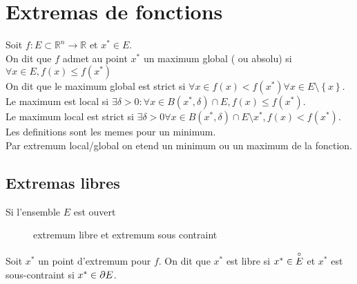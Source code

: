 \documentclass[../main.tex]{subfiles}
\begin{document}
\section{Extremas de fonctions}

\begin{defn}
	Soit $f: E \subset \mathbb{R}^n \to \mathbb{R}$ et $x^{*} \in E$.\\
	On dit que $f$ admet au point $x^{*}$ un maximum global ( ou absolu) si $\forall x \in E, f( x) \leq f( x^{*}) $ \\
	On dit que le maximum global est strict si $\forall x \in f( x) < f( x^{*}) \forall x \in E \setminus \left\{ x \right\} $.\\
	Le maximum est local si $\exists \delta >0 : \forall x \in B( x^{*},\delta) \cap E, f( x) \leq f( x^{*}) $.\\
	Le maximum local est strict si $\exists \delta >0 \forall x \in B( x^{*},\delta) \cap E \setminus x^{*}, f( x) < f( x^{*}) $.\\
	Les definitions sont les memes pour un minimum.\\
	Par extremum local/global on etend un minimum ou un maximum de la fonction.
\end{defn}
\subsection{Extremas libres}
Si l'ensemble $E$ est ouvert
\begin{figure}[H]
    \centering
    \caption{extremum libre et extremum sous contraint}
    \label{fig:extremum-libre}
\end{figure}
Soit $x^{*}$ un point d'extremum pour $f.$ On dit que $x^{*}$ est libre si $x^{*}\in \overset{\circ}{E}$ et $ x^{*}$ est sous-contraint si $x^{*}\in \partial E$.
\end{document}

